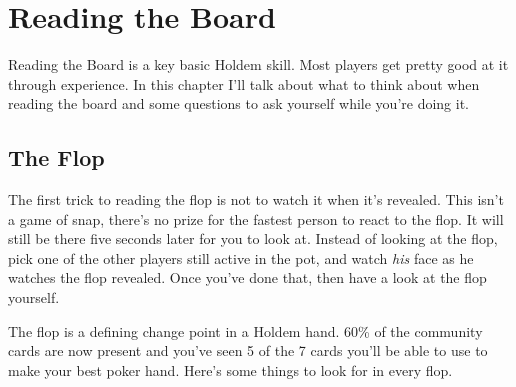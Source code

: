 \chapter{Reading the Board}

Reading the Board is a key basic Holdem skill. Most players get
pretty good at it through experience. In this chapter I'll talk about
what to think about when reading the board and some questions to ask
yourself while you're doing it.

\section{The Flop}

The first trick to reading the flop is not to watch it when it's
revealed. This isn't a game of snap, there's no prize for the fastest
person to react to the flop. It will still be there five seconds later
for you to look at. Instead of looking at the flop, pick one of the
other players still active in the pot, and watch \textit{his} face as
he watches the flop revealed. Once you've done that, then have a look
at the flop yourself.

The flop is a defining change point in a Holdem hand. 60\% of the
community cards are now present and you've seen 5 of the 7 cards
you'll be able to use to make your best poker hand. Here's some things
to look for in every flop.

